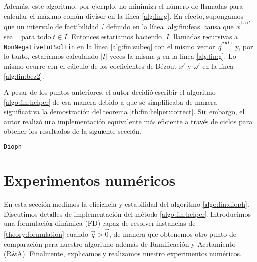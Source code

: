 Además, este algoritmo, por ejemplo, no minimiza el número de llamadas para calcular el máximo común
divisor en la línea \ref{alg:fin:g}. En efecto, supongamos que un intervalo de factibilidad $I$
definido en la línea \ref{alg:fin:feas} causa que $\vec{x}^{\texttt{tail}}$ sea \NIL~ para todo
$t \in I$. Entonces estaríamos haciendo $|I|$ llamadas recursivas a \texttt{NonNegativeIntSolFin} en
la línea \ref{alg:fin:subeq} con el mismo vector $\vec{q}^{\texttt{tail}}$ y, por lo tanto,
estaríamos calculando $|I|$ veces la misma $g$ en la línea \ref{alg:fin:g}. Lo mismo ocurre con el
cálculo de los coeficientes de Bézout $x'$ y $\omega'$ en la línea \ref{alg:fin:bez2}.

A pesar de los puntos anteriores, el autor decidió escribir el algoritmo \ref{algo:fin:helper} de
esa manera debido a que se simplificaba de manera significativa la demostración del teorema
\ref{th:fin:helper:correct}. Sin embargo, el autor realizó una implementación equivalente más
eficiente a través de ciclos para obtener los resultados de la siguiente sección.

\begin{algorithm}[ht]
	\LinesNumbered
	\caption{\texttt{Dioph}}
	\label{algo:fin:dioph}
\end{algorithm}

\section{Experimentos numéricos}
\label{sec:fin:ex}
\noindent
En esta sección medimos la eficiencia y estabilidad del algoritmo \ref{algo:fin:dioph}. Discutimos
detalles de implementación del método \ref{algo:fin:helper}. Introducimos una formulación dinámica
(FD) capaz de resolver instancias de \eqref{theory:formulation} cuando $\vec{q} > \vec{0}$, de
manera que obtenemos otro punto de comparación para nuestro algoritmo además de Ramificación y
Acotamiento (R\&A). Finalmente, explicamos y realizamos nuestro experimentos numéricos.

